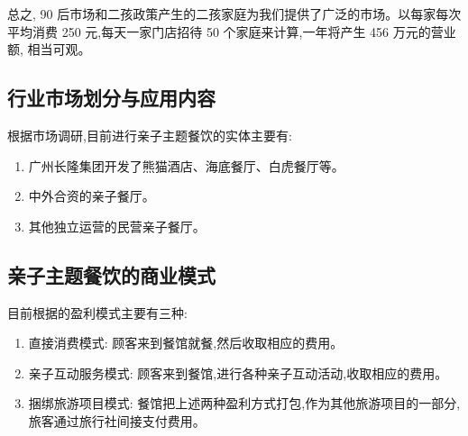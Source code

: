 总之, 90 后市场和二孩政策产生的二孩家庭为我们提供了广泛的市场。以每家每次
平均消费 250 元,每天一家门店招待 50 个家庭来计算,一年将产生 456 万元的营业额,
相当可观。

\subsection{行业市场划分与应用内容}
根据市场调研,目前进行亲子主题餐饮的实体主要有:
\begin{enumerate}[1)]
\item
广州长隆集团开发了熊猫酒店、海底餐厅、白虎餐厅等。
\item
中外合资的亲子餐厅。
\item
其他独立运营的民营亲子餐厅。
\end{enumerate}

\subsection{亲子主题餐饮的商业模式}
目前根据的盈利模式主要有三种:
\begin{enumerate}[1)]
\item
直接消费模式: 顾客来到餐馆就餐,然后收取相应的费用。
\item
亲子互动服务模式: 顾客来到餐馆,进行各种亲子互动活动,收取相应的费用。
\item
捆绑旅游项目模式: 餐馆把上述两种盈利方式打包,作为其他旅游项目的一部分,
旅客通过旅行社间接支付费用。
\end{enumerate}
